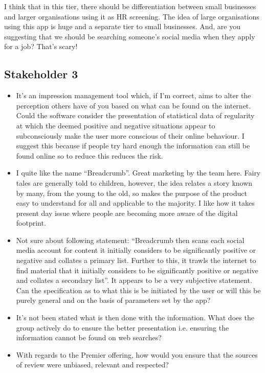       I think that in this tier, there should be differentiation between small businesses and larger organisations using it as HR screening. The idea of large organisations using this app is huge and a separate tier to small businesses. And, are you suggesting that we should be searching someone's social media when they apply for a job? That's scary!

  \subsection{Stakeholder 3}

    \begin{itemize}
      \item It's an impression management tool which, if I'm correct, aims to alter the perception others have of you based on what can be found on the internet. Could the software consider the presentation of statistical data of regularity at which the deemed positive and negative situations appear to subconsciously make the user more conscious of their online behaviour. I suggest this because if people try hard enough the information can still be found online so to reduce this reduces the risk.
      \item I quite like the name ``Breadcrumb''. Great marketing by the team here. Fairy tales are generally told to children, however, the idea relates a story known by many, from the young to the old, so makes the purpose of the product easy to understand for all and applicable to the majority. I like how it takes present day issue where people are becoming more aware of the digital footprint.
      \item Not sure about following statement: ``Breadcrumb then scans each social media account for content it initially considers to be significantly positive or negative and collates a primary list. Further to this, it trawls the internet to find material that it initially considers to be significantly positive or negative and collates a secondary list''. It appears to be a very subjective statement. Can the specification as to what this is be initiated by the user or will this be purely general and on the basis of parameters set by the app?
      \item It's not been stated what is then done with the information. What does the group actively do to ensure the better presentation i.e. ensuring the information cannot be found on web searches?
      \item With regards to the Premier offering, how would you ensure that the sources of review were unbiased, relevant and respected?
    \end{itemize}

